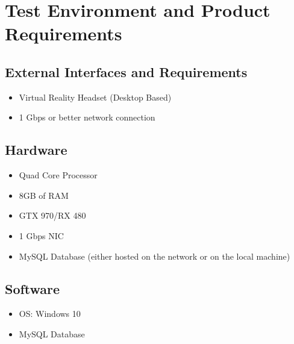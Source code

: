 \documentclass[letterpaper,10pt,english,openany,oneside]{sphinxmanual}
\begin{document}
\chapter{Test Environment and Product Requirements}
\label{\detokenize{test_plan/test_environment_and_product_requirements:test-environment-and-product-requirements}}\label{\detokenize{test_plan/test_environment_and_product_requirements::doc}}

\section{External Interfaces and Requirements}
\label{\detokenize{test_plan/test_environment_and_product_requirements:external-interfaces-and-requirements}}\begin{itemize}
\item {} 
Virtual Reality Headset (Desktop Based)

\item {} 
1 Gbps or better network connection

\end{itemize}


\section{Hardware}
\label{\detokenize{test_plan/test_environment_and_product_requirements:hardware}}\begin{itemize}
\item {} 
Quad Core Processor

\item {} 
8GB of RAM

\item {} 
GTX 970/RX 480

\item {} 
1 Gbps NIC

\item {} 
MySQL Database (either hosted on the network or on the local machine)

\end{itemize}


\section{Software}
\label{\detokenize{test_plan/test_environment_and_product_requirements:software}}\begin{itemize}
\item {} 
OS: Windows 10

\item {} 
MySQL Database

\end{itemize}
\end{document}
